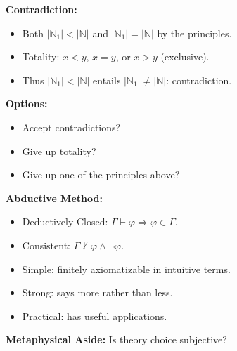 \documentclass[handout]{beamer}
\newcommand{\abs}[1]{|#1|} %
\newcommand{\N}{\mathbb{N}}
\begin{document}

\begin{frame}

  \textbf{Contradiction:}
  \pause

    \begin{itemize}
      \item Both $\abs{\N_1}<\abs{\N}$ and $\abs{\N_1}=\abs{\N}$ by the principles.
      \item Totality: $x < y$, $x = y$, or $x > y$ (exclusive).
      \item Thus $\abs{\N_1}<\abs{\N}$ entails $\abs{\N_1} \neq \abs{\N}$: contradiction.
    \end{itemize}
    \vspace{.2in}
    \pause

  \textbf{Options:}
  \pause

    \begin{itemize}
      \item Accept contradictions?
      \item Give up totality?
      \item Give up one of the principles above?
    \end{itemize}

\end{frame}


\begin{frame}

  \textbf{Abductive Method:}
  \pause

  \begin{itemize}
    \item Deductively Closed: $\Gamma \vdash \varphi \Rightarrow \varphi \in \Gamma$.
    \item Consistent: $\Gamma\nvdash \varphi\wedge\neg\varphi$.
    \item Simple: finitely axiomatizable in intuitive terms.
    \item Strong: says more rather than less.
    \item Practical: has useful applications.
  \end{itemize}
  \vspace{.2in}
  \pause

  \textbf{Metaphysical Aside:} Is theory choice subjective?

\end{frame}
\end{document}

